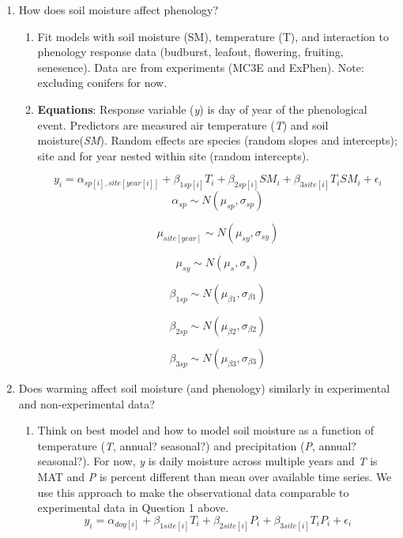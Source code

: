 \documentclass{article}
\begin{document}
\begin{singlespace}
\begin{enumerate}
\item How does soil moisture affect phenology?
\begin{enumerate}
\item Fit models with soil moisture (SM), temperature (T), and interaction to phenology response data (budburst, leafout, flowering, fruiting, senesence). Data are from experiments (MC3E and ExPhen). Note: excluding conifers for now.
\item{\textbf{Equations}: Response variable (\textit{y}) is day of year of the phenological event. Predictors are measured air temperature (\textit{T}) and soil moisture(\textit{SM}). Random effects are species (random slopes and intercepts); site and for year nested within site (random intercepts).}

\begin{equation}
y_{i}=\alpha_{sp[i],site[year[i]]}+ \beta_{1 sp[i]}T_i+\beta_{2 sp[i]}SM_i+\beta_{3 site[i]}T_iSM_i+\epsilon_{i}
\end{equation}
\begin{equation}
\alpha_{sp}\sim N(\mu_{sp}, \sigma_{sp})
\end{equation}

\begin{equation}
\mu_{site[year]} \sim N(\mu_{sy}, \sigma_{sy})
\end{equation}

\begin{equation}
\mu_{sy} \sim N(\mu_{s}, \sigma_{s})
\end{equation}

\begin{equation}
\beta_{1 sp} \sim N(\mu_{\beta1}, \sigma_{\beta1})
\end{equation}

\begin{equation}
\beta_{2 sp} \sim N(\mu_{\beta2}, \sigma_{\beta2})
\end{equation}

\begin{equation}
\beta_{3 sp} \sim N(\mu_{\beta3}, \sigma_{\beta3})
\end{equation}
\end{enumerate}

\item Does warming affect soil moisture (and phenology) similarly in experimental and non-experimental data?

\begin{enumerate}
\item Think on best model and how to model soil moisture as a function of temperature (\textit{T}, annual? seasonal?) and precipitation (\textit{P}, annual? seasonal?). For now, \textit{y} is daily moisture across multiple years and \textit{T} is MAT and \textit{P} is percent different than mean over available time series. We use this approach to make the observational data comparable to experimental data in Question 1 above.
\begin{equation}
y_{i}=\alpha_{doy[i]}+\beta_{1 site[i]}T_i+\beta_{2 site[i]}P_i+\beta_{3 site[i]}T_iP_i+\epsilon_{i}
\end{equation}


\end{enumerate}
\end{enumerate}
\end{singlespace}
\end{document}
